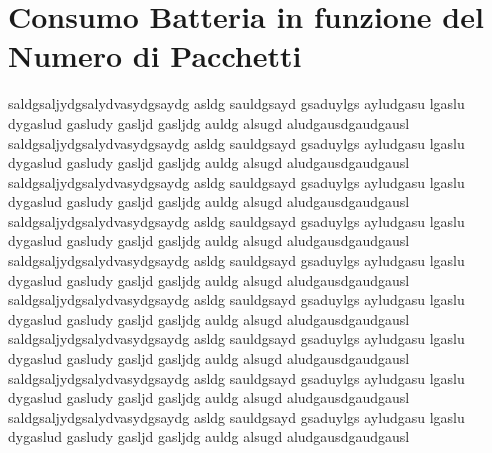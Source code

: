     \section{Consumo Batteria in funzione del Numero di Pacchetti}

    saldgsaljydgsalydvasydgsaydg asldg sauldgsayd gsaduylgs ayludgasu lgaslu dygaslud gasludy gasljd gasljdg auldg alsugd aludgausdgaudgausl
    saldgsaljydgsalydvasydgsaydg asldg sauldgsayd gsaduylgs ayludgasu lgaslu dygaslud gasludy gasljd gasljdg auldg alsugd aludgausdgaudgausl
    saldgsaljydgsalydvasydgsaydg asldg sauldgsayd gsaduylgs ayludgasu lgaslu dygaslud gasludy gasljd gasljdg auldg alsugd aludgausdgaudgausl
    saldgsaljydgsalydvasydgsaydg asldg sauldgsayd gsaduylgs ayludgasu lgaslu dygaslud gasludy gasljd gasljdg auldg alsugd aludgausdgaudgausl
    saldgsaljydgsalydvasydgsaydg asldg sauldgsayd gsaduylgs ayludgasu lgaslu dygaslud gasludy gasljd gasljdg auldg alsugd aludgausdgaudgausl
    saldgsaljydgsalydvasydgsaydg asldg sauldgsayd gsaduylgs ayludgasu lgaslu dygaslud gasludy gasljd gasljdg auldg alsugd aludgausdgaudgausl
    saldgsaljydgsalydvasydgsaydg asldg sauldgsayd gsaduylgs ayludgasu lgaslu dygaslud gasludy gasljd gasljdg auldg alsugd aludgausdgaudgausl
    saldgsaljydgsalydvasydgsaydg asldg sauldgsayd gsaduylgs ayludgasu lgaslu dygaslud gasludy gasljd gasljdg auldg alsugd aludgausdgaudgausl
    saldgsaljydgsalydvasydgsaydg asldg sauldgsayd gsaduylgs ayludgasu lgaslu dygaslud gasludy gasljd gasljdg auldg alsugd aludgausdgaudgausl
